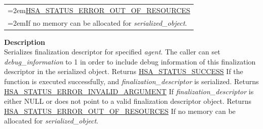 \documentclass[final]{book}
\begin{document}
\begin{appendices}
\begin{longtable}{@{}>{\hangindent=2em}p{\linewidth}}
\hyperlink{group--status-1ggad755322e7ff95456520e8abdbe90d225a1a77fcf36d0d140874c4361ab093eff7}{HSA_STATUS_ERROR_OUT_OF_RESOURCES}\\\hspace{2em}If no memory can be allocated for \textit{serialized_object}.
\end{longtable}
\vspace{-4mm}\noindent\textbf{Description}\\[1mm]
Serializes finalization descriptor for specified \textit{agent}. The caller can set \textit{debug_information} to 1 in order to include debug information of this finalization descriptor in the serialized object. Returns \hyperlink{group--status-1ggad755322e7ff95456520e8abdbe90d225ae382ea0c9c05cce5a60d0317375159cc}{HSA_STATUS_SUCCESS} If the function is executed successfully, and \textit{finalization_descriptor} is serialized. Returns \hyperlink{group--status-1ggad755322e7ff95456520e8abdbe90d225ac7d3651f75107d2a6a8ba3b25683c030}{HSA_STATUS_ERROR_INVALID_ARGUMENT} If \textit{finalization_descriptor} is either NULL or does not point to a valid finalization descriptor object. Returns \hyperlink{group--status-1ggad755322e7ff95456520e8abdbe90d225a1a77fcf36d0d140874c4361ab093eff7}{HSA_STATUS_ERROR_OUT_OF_RESOURCES} If no memory can be allocated for \textit{serialized_object}. 



\end{appendices}
\end{document}
